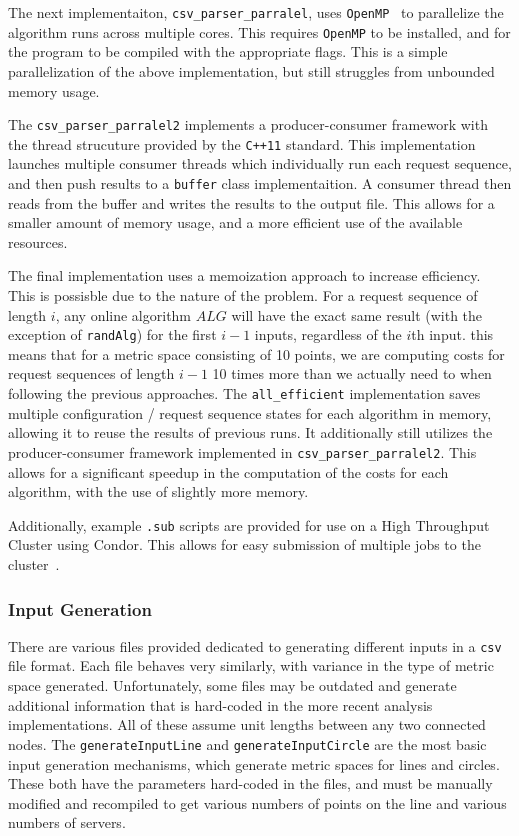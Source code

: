 The next implementaiton, \texttt{csv\_parser\_parralel}, uses \texttt{OpenMP}~\cite{openmp08} to parallelize the algorithm runs across multiple cores. This requires \texttt{OpenMP} to be installed, and for the program to be compiled with the appropriate flags. This is a simple parallelization of the above implementation, but still struggles from unbounded memory usage.

The \texttt{csv\_parser\_parralel2} implements a producer-consumer framework with the thread strucuture provided by the \texttt{C++11} standard. This implementation launches multiple consumer threads which individually run each request sequence, and then push results to a \texttt{buffer} class implementaition. A consumer thread then reads from the buffer and writes the results to the output file. This allows for a smaller amount of memory usage, and a more efficient use of the available resources.


The final implementation uses a memoization approach to increase efficiency. This is possisble due to the nature of the \KS problem. For a request sequence of length $i$, any online algorithm $ALG$ will have the exact same result (with the exception of \texttt{randAlg}) for the first $i-1$ inputs, regardless of the $i$th input. this means that for a metric space consisting of 10 points, we are computing costs for request sequences of length $i-1$ 10 times more than we actually need to when following the previous approaches. The \texttt{all\_efficient} implementation saves multiple configuration / request sequence states for each algorithm in memory, allowing it to reuse the results of previous runs. It additionally still utilizes the producer-consumer framework implemented in \texttt{csv\_parser\_parralel2}. This allows for a significant speedup in the computation of the costs for each algorithm, with the use of slightly more memory.

Additionally, example \texttt{.sub} scripts are provided for use on a High Throughput Cluster using Condor. This allows for easy submission of multiple jobs to the cluster~\cite{htcondor}. 

\subsubsection*{Input Generation}

There are various files provided dedicated to generating different inputs in a \texttt{csv} file format. Each file behaves very similarly, with variance in the type of metric space generated. Unfortunately, some files may be outdated and generate additional information that is hard-coded in the more recent analysis implementations. All of these assume unit lengths between any two connected nodes. The \texttt{generateInputLine} and \texttt{generateInputCircle} are the most basic input generation mechanisms, which generate metric spaces for lines and circles. These both have the parameters hard-coded in the files, and must be manually modified and recompiled to get various numbers of points on the line and various numbers of servers.

